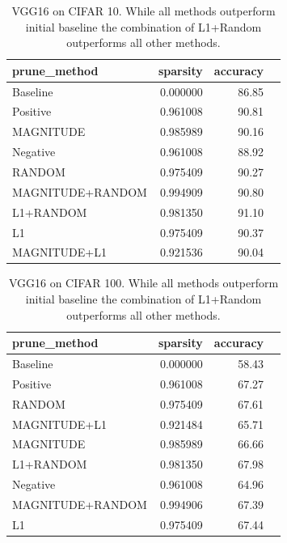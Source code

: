 \documentclass[11pt]{article}
\begin{document}
\begin{table}[h]
\begin{tabular}{|l|r|r|r|}
\hline
     prune\_method &  sparsity &  accuracy \\ \hline 
     Baseline &  0.000000 &     86.85 \\ \hline
         Positive &  0.961008 &     90.81 \\ \hline
        MAGNITUDE &  0.985989 &     90.16 \\ \hline
         Negative &  0.961008 &     88.92 \\ \hline
           RANDOM &  0.975409 &     90.27 \\ \hline
 MAGNITUDE+RANDOM &  0.994909 &     90.80 \\ \hline
        L1+RANDOM &  0.981350 &     91.10 \\ \hline
               L1 &  0.975409 &     90.37 \\ \hline
     MAGNITUDE+L1 &  0.921536 &     90.04 \\ \hline
\end{tabular}
\label{tab:cifar10-VGG16}
\caption{VGG16 on CIFAR 10. While all methods outperform initial baseline the combination of L1+Random outperforms all other methods.}
\end{table}

\begin{table}[h]
\begin{tabular}{|l|r|r|r|}
\hline
     prune\_method &  sparsity &  accuracy \\ \hline 
        Baseline &  0.000000 &     58.43 \\ \hline
         Positive &  0.961008 &     67.27 \\ \hline
           RANDOM &  0.975409 &     67.61 \\ \hline
     MAGNITUDE+L1 &  0.921484 &     65.71 \\ \hline
        MAGNITUDE &  0.985989 &     66.66 \\ \hline
        L1+RANDOM &  0.981350 &     67.98 \\ \hline
         Negative &  0.961008 &     64.96 \\ \hline
 MAGNITUDE+RANDOM &  0.994906 &     67.39 \\ \hline
               L1 &  0.975409 &     67.44 \\ \hline
\end{tabular}
\label{tab:cifar100-VGG16}
\caption{VGG16 on CIFAR 100. While all methods outperform initial baseline the combination of L1+Random outperforms all other methods.}
\end{table}
\end{document}

